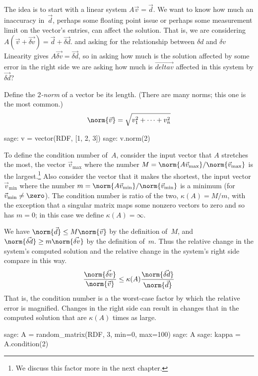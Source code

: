 The idea is to start with a linear system 
$A\vec{v}=\vec{d}$.
We want to know how much an inaccuracy in~$\vec{d}$, perhaps some
floating point issue or perhaps some measurement limit on the vector's entries, 
can affect the solution.
That is, we are considering
$A(\vec{v}+\vec{\delta v})=\vec{d}+\vec{\delta d}$.
and asking for the relationship between $\delta d$ and $\delta v$
Linearity gives $A\vec{\delta v}=\vec{\delta d}$, so in asking 
how much is the solution affected by some error in the right side we are
asking
how much is $\vec{delta v}$ affected in this system by $\vec{\delta d}$?

Define the \textit{$2$-norm} of a vector be 
its length.
(There are many norms; this one is the most common.)
\begin{equation*}
  \norm{\vec{v}}=\sqrt{v_1^2+\cdots+v_n^2}
\end{equation*}
\begin{sagecommandline}
sage: v = vector(RDF, [1, 2, 3])
sage: v.norm(2)
\end{sagecommandline}
To define the condition number of~$A$, 
consider the input vector that $A$ stretches
the most, the vector $\vec{v}_{\text{max}}$
where the number $M=\norm{A\vec{v}_{\text{max}}}/\norm{\vec{v}_{\text{max}}}$ 
is the largest.\footnote{%
  We discuss this factor more in the next chapter.}
Also consider the vector that it makes the shortest, the 
input vector $\vec{v}_{\text{min}}$ 
where the number
$m=\norm{A\vec{v}_{\text{min}}}/\norm{\vec{v}_{\text{min}}}$ is a minimum 
(for $\vec{v}_{\text{min}}\neq\zero$).
The condition number is ratio of the two, 
$\kappa(A)=M/m$, with the exception 
that a singular matrix maps some nonzero vectors to zero and
so has $m=0$; in this case we define $\kappa(A)=\infty$.

We have $\norm{\vec{d}}\leq M\norm{\vec{v}}$ by the definition of~$M$, and
$\norm{\vec{\delta d}}\geq m\norm{\vec{\delta v}}$ 
by the definition of~$m$.
Thus the relative change in the 
system's computed solution
and the relative change in the system's right side
compare in this way. 
\begin{equation*}
  \frac{\norm{\vec{\delta v}}}{\norm{\vec{v}}}
   \leq \kappa(A)\frac{\norm{\vec{\delta d}}}{\norm{\vec{d}}}
\end{equation*}
That is, the condition number is a the worst-case factor by which the
relative error is magnified. 
Changes in the right side can result in changes 
that in the computed solution that are $\kappa(A)$ times as large.

\begin{sagecommandline}
sage: A = random_matrix(RDF, 3, min=0, max=100)
sage: A
sage: kappa = A.condition(2)
\end{sagecommandline}





